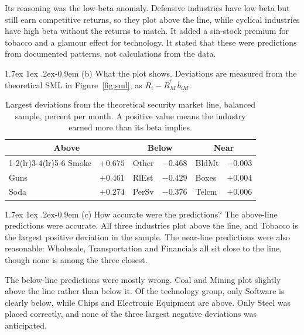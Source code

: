 \documentclass[11pt]{article}
\makeatletter
\renewcommand\paragraph{\@startsection{paragraph}{4}{0pt}%
  {1.7ex \@plus 1ex \@minus .2ex}{-0.9em}%
  {\normalfont\bfseries\normalsize\color{psink}}}
\makeatother
\begin{document}
Its reasoning was the low-beta anomaly. Defensive industries have low beta but
still earn competitive returns, so they plot above the line, while cyclical
industries have high beta without the returns to match. It added a sin-stock
premium for tobacco and a glamour effect for technology. It stated that these
were predictions from documented patterns, not calculations from the data.

\paragraph{(b) What the plot shows.} Deviations are measured from the
theoretical SML in Figure~\ref{fig:sml}, as
$\overline{R_i} - \bar{R}_M^{e}\,b_{iM}$.

\begin{table}[H]
\centering
\caption{Largest deviations from the theoretical security market line, balanced
sample, percent per month. A positive value means the industry earned more than
its beta implies.}
\small
\begin{tabular}{lrlrlr}
\toprule
\multicolumn{2}{c}{Above} & \multicolumn{2}{c}{Below}
& \multicolumn{2}{c}{Near} \\
\cmidrule(lr){1-2}\cmidrule(lr){3-4}\cmidrule(lr){5-6}
Smoke & $+0.675$ & Other & $-0.468$ & BldMt & $-0.003$ \\
Guns  & $+0.461$ & RlEst & $-0.429$ & Boxes & $+0.004$ \\
Soda  & $+0.274$ & PerSv & $-0.376$ & Telcm & $+0.006$ \\
\bottomrule
\end{tabular}
\label{tab:dev}
\end{table}

\paragraph{(c) How accurate were the predictions?} The above-line predictions
were accurate. All three industries plot above the line, and Tobacco is the
largest positive deviation in the sample. The near-line predictions were also
reasonable: Wholesale, Transportation and Financials all sit close to the line,
though none is among the three closest.

The below-line predictions were mostly wrong. Coal and Mining plot slightly
above the line rather than below it. Of the technology group, only Software is
clearly below, while Chips and Electronic Equipment are above. Only Steel was
placed correctly, and none of the three largest negative deviations was
anticipated.
\end{document}
